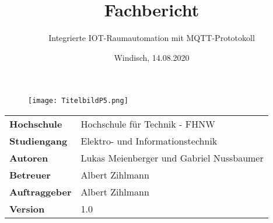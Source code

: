 \documentclass[final]{fhnwreport}         %
\title{Fachbericht}  %
\author{Integrierte IOT-Raumautomation mit MQTT-Prototokoll}                      %
\date{Windisch, 14.08.2020}               %
\begin{document}
\maketitle

\vspace*{-1cm}
\vfill
\begin{figure}[H]
\centering
\texttt{[image: TitelbildP5.png]}
\end{figure}
\vfill

\begin{center}
\renewcommand\arraystretch{2}
\begin{tabular}{>{\bf}p{4cm} l}
Hochschule                 &    Hochschule für Technik - FHNW\\
Studiengang                &    Elektro- und Informationstechnik\\
Autoren   		                 & 	 Lukas Meienberger und Gabriel Nussbaumer\\
Betreuer                   &     Albert Zihlmann\\
Auftraggeber               &    Albert Zihlmann\\
Version                    &    1.0 %
\end{tabular}
\end{center}

\clearpage
			
\thispagestyle{empty}


\tableofcontents
\clearpage










{\sloppypar
\printbibliography[heading=bibintoc]
}

%

\end{document}
